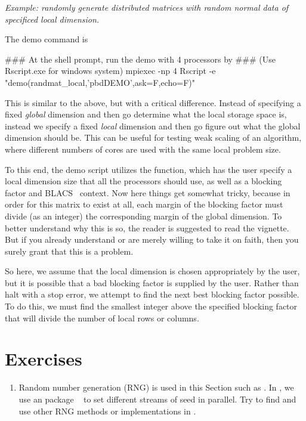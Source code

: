 \emph{Example:  randomly generate distributed matrices with random normal data 
of specificed local dimension.}

The demo command is
\begin{Command}
### At the shell prompt, run the demo with 4 processors by
### (Use Rscript.exe for windows system)
mpiexec -np 4 Rscript -e "demo(randmat_local,'pbdDEMO',ask=F,echo=F)"
\end{Command}

This is similar to the above, but with a critical difference.  Instead of 
specifying a fixed \emph{global} dimension and then go determine what the local 
storage space is, instead we specify a fixed \emph{local} dimension and then go 
figure out what the global dimension should be.  This can be useful for testing 
weak scaling of an algorithm, where different numbers of cores are used with the 
same local problem size.

To this end, the demo script utilizes the  function, 
which has the user specify a local dimension size that all the processors should 
use, as well as a blocking factor and BLACS~ context.  Now 
here things get somewhat tricky, because in order for this matrix to exist at 
all, each margin of the blocking factor must divide (as an integer) the 
corresponding margin of the global dimension.  To better understand why this is 
so, the reader is suggested to read the  vignette.  But if you 
already understand or are merely willing to take it on faith, then you surely 
grant that this is a problem.

So here, we assume that the local dimension is chosen appropriately by the user, 
but it is possible that a bad blocking factor is supplied by the user.  Rather 
than halt with a stop error, we attempt to find the next best blocking factor 
possible.  To do this, we must find the smallest integer above the specified 
blocking factor that will divide the number of local rows or columns.




\section{Exercises}
\label{sec:gen_exercise}

\begin{enumerate}[label=\thechapter-\arabic*]
\item
Random number generation (RNG) is used in this Section such as .
In \pbdR, we use an  package
~\citep{rlecuyer}
to set different streams of seed in
parallel. Try to find and use other RNG methods or implementations
in .

\end{enumerate}
